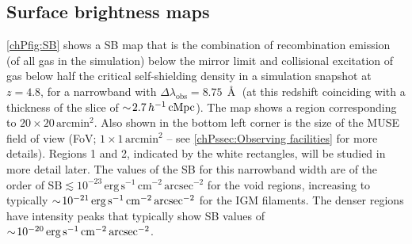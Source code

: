 \subsection{Surface brightness maps}
\label{chPssec:Surface brightness maps}

\cref{chPfig:SB} shows a SB map that is the combination of recombination emission (of all gas in the simulation) below the mirror limit and collisional excitation of gas below half the critical self-shielding density in a simulation snapshot at $z=4.8$, for a narrowband with $\Delta \lambda_\text{obs} = 8.75 \, \Angstrom$ (at this redshift coinciding with a thickness of the slice of $\sim \! 2.7 \, h^{-1} \, \mathrm{cMpc}$). The map shows a region corresponding to $20 \times 20 \, \mathrm{arcmin}^2$. Also shown in the bottom left corner is the size of the MUSE field of view (FoV; $1 \times 1 \, \mathrm{arcmin}^2$ -- see \cref{chPssec:Observing facilities} for more details). Regions 1 and 2, indicated by the white rectangles, will be studied in more detail later. The values of the SB for this narrowband width are of the order of $\text{SB} \lesssim 10^{-23} \, \mathrm{erg \, s^{-1} \, cm^{-2} \, arcsec^{-2}}$ for the void regions, increasing to typically $\sim \! 10^{-21} \, \mathrm{erg \, s^{-1} \, cm^{-2} \, arcsec^{-2}}$ for the IGM filaments. The denser regions have intensity peaks that typically show SB values of $\sim \! 10^{-20} \, \mathrm{erg \, s^{-1} \, cm^{-2} \, arcsec^{-2}}$.

